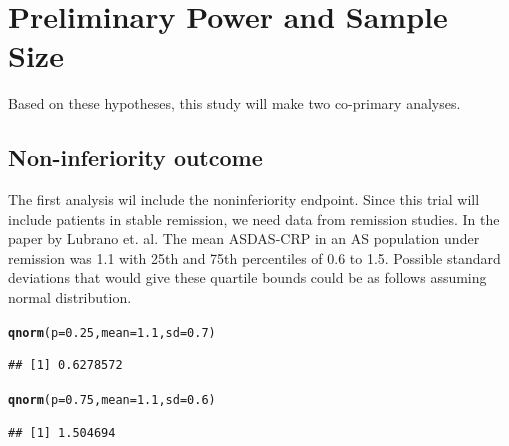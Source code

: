 \documentclass{article}\usepackage[]{graphicx}\usepackage[]{color}
\makeatletter
\newcommand{\hlnum}[1]{\textcolor[rgb]{0.686,0.059,0.569}{#1}}%
\newcommand{\hlstd}[1]{\textcolor[rgb]{0.345,0.345,0.345}{#1}}%
\newcommand{\hlkwc}[1]{\textcolor[rgb]{0.333,0.667,0.333}{#1}}%
\newcommand{\hlkwd}[1]{\textcolor[rgb]{0.737,0.353,0.396}{\textbf{#1}}}%
\newenvironment{kframe}{%
 \def\at@end@of@kframe{}%
 \ifinner\ifhmode%
  \def\at@end@of@kframe{\end{minipage}}%
  \begin{minipage}{\columnwidth}%
 \fi\fi%
 \def\FrameCommand##1{\hskip\@totalleftmargin \hskip-\fboxsep
 \colorbox{shadecolor}{##1}\hskip-\fboxsep
     \hskip-\linewidth \hskip-\@totalleftmargin \hskip\columnwidth}%
 \MakeFramed {\advance\hsize-\width
   \@totalleftmargin\z@ \linewidth\hsize
   \@setminipage}}%
 {\par\unskip\endMakeFramed%
 \at@end@of@kframe}
\newenvironment{knitrout}{}{} %
\makeatother
\begin{document}
\section{Preliminary Power and Sample Size}

Based on these hypotheses, this study will make two co-primary analyses.

\subsection{Non-inferiority outcome}
The first analysis wil include the noninferiority endpoint. Since this trial will include patients in stable remission, we need data from remission studies. In the paper by Lubrano et. al. The mean ASDAS-CRP in an AS population under remission was 1.1 with 25th and 75th percentiles of 0.6 to 1.5. Possible standard deviations that would give these quartile bounds could be as follows assuming normal distribution.
\begin{knitrout}
\color{fgcolor}\begin{kframe}
\begin{alltt}
\hlkwd{qnorm}\hlstd{(}\hlkwc{p}\hlstd{=}\hlnum{0.25}\hlstd{,}\hlkwc{mean}\hlstd{=}\hlnum{1.1}\hlstd{,} \hlkwc{sd}\hlstd{=}\hlnum{0.7}\hlstd{)}
\end{alltt}
\begin{verbatim}
## [1] 0.6278572
\end{verbatim}
\begin{alltt}
\hlkwd{qnorm}\hlstd{(}\hlkwc{p}\hlstd{=}\hlnum{0.75}\hlstd{,}\hlkwc{mean}\hlstd{=}\hlnum{1.1}\hlstd{,} \hlkwc{sd}\hlstd{=}\hlnum{0.6}\hlstd{)}
\end{alltt}
\begin{verbatim}
## [1] 1.504694
\end{verbatim}
\end{kframe}
\end{knitrout}
\end{document}
